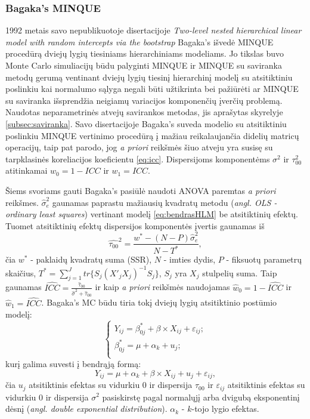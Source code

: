 \documentclass[12pt,a4paper]{article}
\begin{document}
\subsubsection{Bagaka's MINQUE}
1992 metais savo nepublikuotoje disertacijoje \textit{Two-level nested hierarchical linear model with random intercepts via the bootstrap}\cite{bagaka} Bagaka's išvedė MINQUE procedūrą dviejų lygių tiesiniams hierarchiniams modeliams. Jo tikslas buvo Monte Carlo simuliacijų būdu palyginti MINQUE ir MINQUE su saviranka metodų gerumą ventinant dviejų lygių tiesinį hierarchinį modelį su atsitiktiniu poslinkiu kai normalumo sąlyga negali būti užtikrinta bei pažiūrėti ar MINQUE su saviranka išsprendžia neigiamų variacijos komponenčių įverčių problemą. Naudotas neparametrinės atvejų savirankos metodas, jis aprašytas skyrelyje \ref{subsec:saviranka}. Savo disertacijoje Bagaka's suveda modelio su atsitiktiniu poslinkiu MINQUE vertinimo procedūrą į mažiau reikalaujančia didelių matricų operacijų, taip pat parodo, jog \textit{a priori} reikšmės šiuo atveju yra susisę su tarpklasinės koreliacijos koeficientu \ref{eq:icc}. Dispersijoms komponentėms $\sigma^2$ ir $\tau_{00}^2$ atitinkamai $w_0=1-ICC$ ir $w_1=ICC$.

\indent Šiems svoriams gauti Bagaka's pasiūlė naudoti ANOVA paremtas \textit{a priori} reikšmes. $\hat{\sigma}^2_{e}$ gaunamas paprastu mažiausių kvadratų metodu (\textit{angl. OLS - ordinary least squares}) vertinant modelį \ref{eq:bendrasHLM} be atsitiktinių efektų. Tuomet atsitiktinių efektų dispersijos komponentės įvertis gaunamas iš
\[
\hat{\tau_{00}}^2=\frac{w^*-(N-P)\hat{\sigma}_e^2}{N-T^*},
\]
čia $w^*$ - paklaidų kvadratų suma (SSR), $N$ - imties dydis, $P$ - fiksuotų parametrų skaičius, $T^*=\sum_{j=1}^J tr\{S_j(X'_jX_j)^{-1}S_j\}$, $S_j$ yra $X_j$ stulpelių suma. Taip gaunamas $\widehat{ICC} = \frac{\hat{\tau}_{00}}{\hat{\sigma}^2+\hat{\tau}_{00}}$ ir kaip \textit{a priori} reikšmės naudojamas $\hat{w}_0=1-\widehat{ICC}$ ir $\hat{w}_1=\widehat{ICC}$.
\indent Bagaka's MC būdu tiria tokį dviejų lygių atsitiktinio postūmio modelį:
\begin{equation}\label{eq:beqa}
\left\{
\begin{array}{l}
Y_{ij} = \beta^*_{0j}+ \beta \times X_{ij}+\varepsilon_{ij}; \\
\beta^*_{0j} = \mu+\alpha_k+u_{j};\\
\end{array} \right. 
\end{equation}
kurį galima suvesti į bendrąją formą:
\begin{equation}\label{eq:beq}
Y_{ij}=\mu+\alpha_k+\beta\times X_{ij}+u_j+\varepsilon_{ij}, 
\end{equation}
čia $u_j$ atsitiktinis efektas su vidurkiu 0 ir dispersija $\tau_00$ ir $\varepsilon_{ij}$ atsitiktinis efektas su vidurkiu 0 ir dispersija $\sigma^2$ pasiskirstę pagal normalųjį arba dvigubą eksponentinį dėsnį (\textit{angl. double exponential distribution}). $\alpha_k$ - $k$-tojo lygio efektas.
\end{document}
